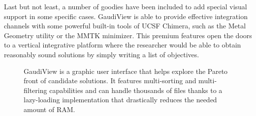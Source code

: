 Last but not least, a number of goodies have been included to add special visual support in some specific cases. GaudiView is able to provide effective integration channels with some powerful built-in tools of UCSF Chimera, such as the Metal Geometry utility or the MMTK minimizer. This premium features open the doors to a vertical integrative platform where the researcher would be able to obtain reasonably sound solutions by simply writing a list of objectives.
\begin{figure}
\noindent{}
\caption[GaudiView, A GUI explorer for complex sets of candidate solution]{GaudiView is a graphic user interface that helps explore the Pareto front of candidate solutions. It features multi-sorting and multi-filtering capabilities and can handle thousands of files thanks to a lazy-loading implementation that drastically reduces the needed amount of RAM.}
\end{figure}
